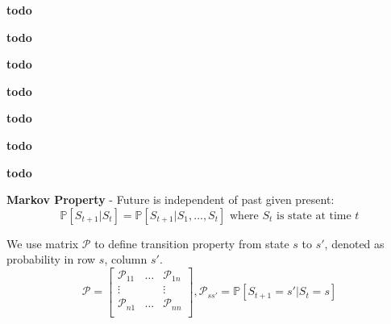 \documentclass[a4paper,10pt]{article}
\begin{document}
\begin{multicols*}{2}
\begin{tcolorbox}[title=Uninformed Search, module]
\end{tcolorbox}


\begin{tcolorbox}[title=Heuristic Search, module]
    \textbf{todo}
\end{tcolorbox}

\begin{tcolorbox}[title=Game Search, module]
    \textbf{todo}
\end{tcolorbox}

\begin{tcolorbox}[title=Constraint Satisfaction, module]
    \textbf{todo}
\end{tcolorbox}

\begin{tcolorbox}[title=Logic, module]
    \textbf{todo}
\end{tcolorbox}

\begin{tcolorbox}[title={Probability \& Uncertainty, Bayesian Networks}, module]
    \textbf{todo}
\end{tcolorbox}

\begin{tcolorbox}[title={Intro to ML, Linear Regression, kNN}, module]
    \textbf{todo}
\end{tcolorbox}

\begin{tcolorbox}[title={Decision Trees and Neural Networks}, module]
    \textbf{todo}
\end{tcolorbox}

\begin{tcolorbox}[title={Reinforcement Learning}, module]
    \textbf{Markov Property} - Future is independent of past given present:
    \[
        \mathbb{P}[S_{t + 1} | S_t] = \mathbb{P}[S_{t + 1} | S_1, \ldots, S_t] \text{ where } S_t \text{ is state at time } t
    \]

    We use matrix $\mathcal{P}$ to define transition property from state $s$ to $s'$, denoted as probability in row $s$, column $s'$.
    \[
        \mathcal{P} =
        \begin{bmatrix}
            \mathcal{P}_{11} & \ldots & \mathcal{P}_{1n} \\
            \vdots && \vdots \\
            \mathcal{P}_{n1} & \ldots & \mathcal{P}_{nn} \\
        \end{bmatrix}
        , \mathcal{P}_{ss'} = \mathbb{P}[S_{t+1} = s' | S_t = s]
    \]


\end{tcolorbox}
\end{multicols*}
\end{document}
